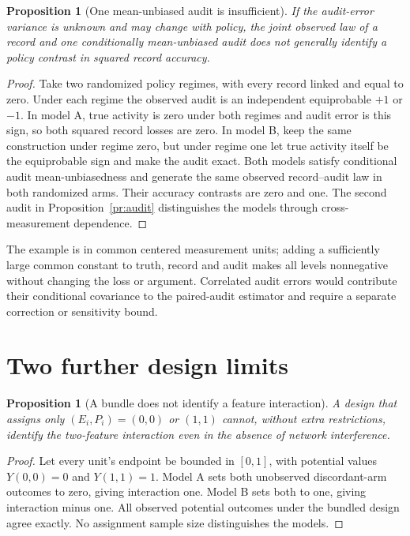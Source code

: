 \documentclass[11pt,a4paper]{article}
\newtheorem{proposition}[theorem]{Proposition}
\theoremstyle{definition}
\theoremstyle{remark}
\begin{document}
\begin{proposition}[One mean-unbiased audit is insufficient]
If the audit-error variance is unknown and may change with policy, the joint observed law of a record and one conditionally mean-unbiased audit does not generally identify a policy contrast in squared record accuracy.
\end{proposition}
\begin{proof}
Take two randomized policy regimes, with every record linked and equal to zero. Under each regime the observed audit is an independent equiprobable $+1$ or $-1$. In model A, true activity is zero under both regimes and audit error is this sign, so both squared record losses are zero. In model B, keep the same construction under regime zero, but under regime one let true activity itself be the equiprobable sign and make the audit exact. Both models satisfy conditional audit mean-unbiasedness and generate the same observed record--audit law in both randomized arms. Their accuracy contrasts are zero and one. The second audit in Proposition~\ref{pr:audit} distinguishes the models through cross-measurement dependence.
\end{proof}

The example is in common centered measurement units; adding a sufficiently large common constant to truth, record and audit makes all levels nonnegative without changing the loss or argument. Correlated audit errors would contribute their conditional covariance to the paired-audit estimator and require a separate correction or sensitivity bound.

\section{Two further design limits}
\begin{proposition}[A bundle does not identify a feature interaction]
A design that assigns only $(E_i,P_i)=(0,0)$ or $(1,1)$ cannot, without extra restrictions, identify the two-feature interaction even in the absence of network interference.
\end{proposition}
\begin{proof}
Let every unit's endpoint be bounded in $[0,1]$, with potential values $Y(0,0)=0$ and $Y(1,1)=1$. Model A sets both unobserved discordant-arm outcomes to zero, giving interaction one. Model B sets both to one, giving interaction minus one. All observed potential outcomes under the bundled design agree exactly. No assignment sample size distinguishes the models.
\end{proof}
\end{document}
